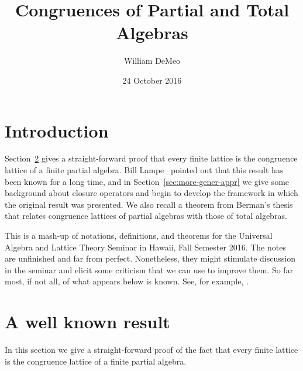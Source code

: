 
\usepackage{inputs/proof-dashed}



\usepackage{inputs/macros}

\usepackage[backend=bibtex]{biblatex}




\title[Congruences of Partial Algebras]{Congruences of Partial and Total Algebras}
\date{24 October 2016}
\author[W.~DeMeo]{William DeMeo}
\address{University of Hawaii}

\maketitle


\section{Introduction}
\label{sec:introduction}
Section~\ref{sec:simple-proof-well} gives a straight-forward proof that every finite
lattice is the congruence lattice of a finite partial algebra.
Bill Lampe~\cite{Lampe:20161017} pointed out
that this result has been known for a long time, and in
Section~\ref{sec:more-gener-appr}
we give some background about closure operators and 
begin to develop the framework in which the original result was presented.
We also recall a theorem from Berman's thesis that relates congruence lattices of
partial algebras with those of total algebras.

This is a mash-up of notations, definitions, and theorems
for the Universal Algebra and Lattice Theory Seminar
in Hawaii, Fall Semester 2016. 
The notes are unfinished and far from perfect.
Nonetheless, they might stimulate discussion
in the seminar and elicit some criticism
that we can use to improve them.
So far most, if not all, of what appears below is known.
See, for example, \cite{MR2619731, MR0308011, MR0237401, MR2455216}.


\section{A well known result}
\label{sec:simple-proof-well}
In this section we give a straight-forward proof of the fact that every finite
lattice is the congruence lattice of a finite partial algebra.


